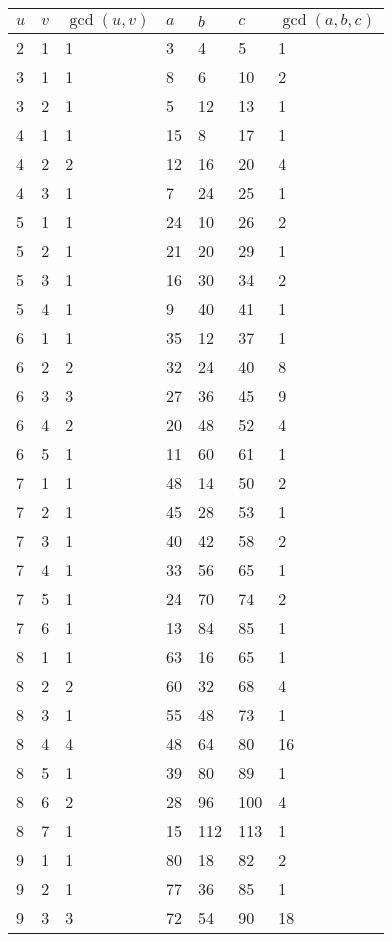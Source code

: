 \documentclass[letterpaper, 12pt]{memoir}
\theoremstyle{mystyle}
\begin{document}
\begin{table}[h!]
    \tiny
    \centering
\begin{tabular}{|l l l|l l l l|}
    \hline
    $u$ & $v$ & $\gcd (u, v)$  & $a$   & $b$   & $c$ & $\gcd(a,b,c)$  \\
    \hline
    2 & 1 & 1 & 3 & 4 & 5 & 1 \\
    3 & 1 & 1 & 8 & 6 & 10 & 2 \\
    3 & 2 & 1 & 5 & 12 & 13 & 1 \\
    4 & 1 & 1 & 15 & 8 & 17 & 1 \\
    4 & 2 & 2 & 12 & 16 & 20 & 4 \\
    4 & 3 & 1 & 7 & 24 & 25 & 1 \\
    5 & 1 & 1 & 24 & 10 & 26 & 2 \\
    5 & 2 & 1 & 21 & 20 & 29 & 1 \\
    5 & 3 & 1 & 16 & 30 & 34 & 2 \\
    5 & 4 & 1 & 9 & 40 & 41 & 1 \\
    6 & 1 & 1 & 35 & 12 & 37 & 1 \\
    6 & 2 & 2 & 32 & 24 & 40 & 8 \\
    6 & 3 & 3 & 27 & 36 & 45 & 9 \\
    6 & 4 & 2 & 20 & 48 & 52 & 4 \\
    6 & 5 & 1 & 11 & 60 & 61 & 1 \\
    7 & 1 & 1 & 48 & 14 & 50 & 2 \\
    7 & 2 & 1 & 45 & 28 & 53 & 1 \\
    7 & 3 & 1 & 40 & 42 & 58 & 2 \\
    7 & 4 & 1 & 33 & 56 & 65 & 1 \\
    7 & 5 & 1 & 24 & 70 & 74 & 2 \\
    7 & 6 & 1 & 13 & 84 & 85 & 1 \\
    8 & 1 & 1 & 63 & 16 & 65 & 1 \\
    8 & 2 & 2 & 60 & 32 & 68 & 4 \\
    8 & 3 & 1 & 55 & 48 & 73 & 1 \\
    8 & 4 & 4 & 48 & 64 & 80 & 16 \\
    8 & 5 & 1 & 39 & 80 & 89 & 1 \\
    8 & 6 & 2 & 28 & 96 & 100 & 4 \\
    8 & 7 & 1 & 15 & 112 & 113 & 1 \\
    9 & 1 & 1 & 80 & 18 & 82 & 2 \\
    9 & 2 & 1 & 77 & 36 & 85 & 1 \\
    9 & 3 & 3 & 72 & 54 & 90 & 18 \\

\end{tabular}
\end{table}
\end{document}
